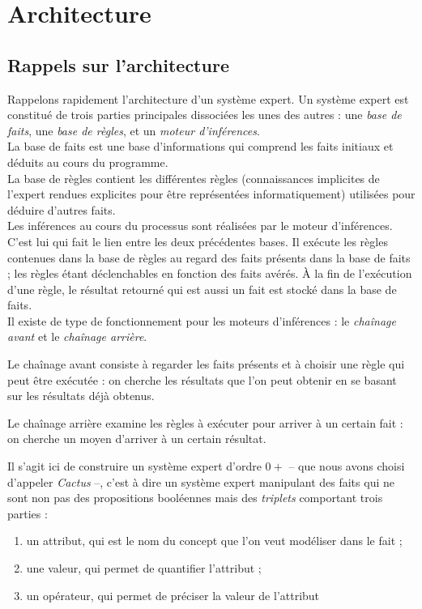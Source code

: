 \documentclass[a4paper,12pt]{article}
\begin{document}
\section{Architecture}

\subsection{Rappels sur l'architecture}
Rappelons rapidement l'architecture d'un système expert.
Un système expert est constitué de trois parties principales dissociées les unes des autres : une \textit{base de faits}, une \textit{base de règles}, et un \textit{moteur d'inférences}.\\

La base de faits est une base d'informations qui comprend les faits initiaux et déduits au cours du programme.\\

La base de règles contient les différentes règles (connaissances implicites de l'expert rendues explicites pour être représentées informatiquement) utilisées pour déduire d'autres faits.\\

Les inférences au cours du processus sont réalisées par le moteur d'inférences. C'est lui qui fait le lien entre les deux précédentes bases. Il exécute les règles contenues dans la base de règles au regard des faits présents dans la base de faits ; les règles étant déclenchables en fonction des faits avérés. À la fin de l'exécution d'une règle, le résultat retourné qui est aussi un fait est stocké dans la base de faits.\\

Il existe de type de fonctionnement pour les moteurs d'inférences : le \textit{chaînage avant} et le \textit{chaînage arrière}.

Le chaînage avant consiste à regarder les faits présents et à choisir une règle qui peut être exécutée : on cherche les résultats que l'on peut obtenir en se basant sur les résultats déjà obtenus.

Le chaînage arrière examine les règles à exécuter pour arriver à un certain fait : on cherche un moyen d'arriver à un certain résultat.


	Il s'agit ici de construire un système expert d'ordre $0+$ -- que nous avons choisi d'appeler \textit{Cactus} --, c'est à dire un système expert manipulant des faits qui ne sont non pas des propositions booléennes mais des \textit{triplets} comportant trois parties :
	\begin{enumerate}
		\item un attribut, qui est le nom du concept que l'on veut modéliser dans le fait ;
		\item une valeur, qui permet de quantifier l'attribut ;
		\item un opérateur, qui permet de préciser la valeur de l'attribut
	\end{enumerate}
	
\end{document}
